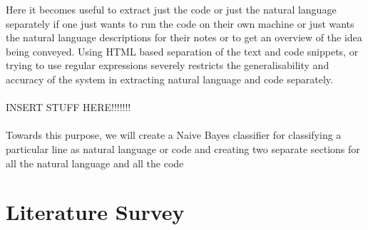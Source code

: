\documentclass[12pt]{scrreprt}
\begin{document}
Here it becomes useful to extract just the code or just the natural language separately if one just wants to run the code on their own machine or just wants the natural language descriptions for their notes or to get an overview of the idea being conveyed. Using HTML based separation of the text and code snippets, or trying to use regular expressions severely restricts the generalisability and accuracy of the system in extracting natural language and code separately.\\
\\ INSERT STUFF HERE!!!!!!!\\
\\ Towards this purpose, we will create a Naive Bayes classifier for classifying a particular line as natural language or code and creating two separate sections for all the natural language and all the code

\chapter{Literature Survey}



\end{document}
